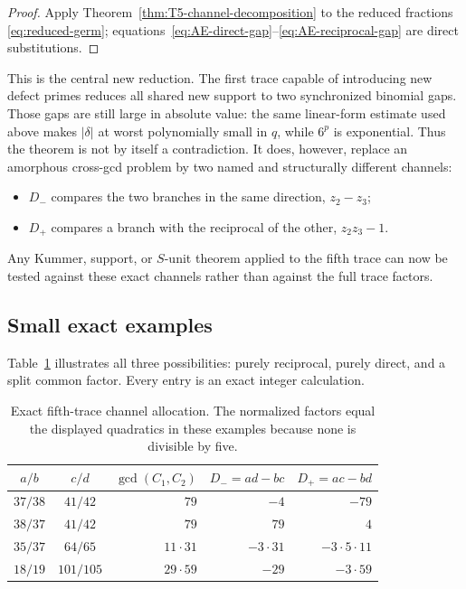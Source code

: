 \documentclass[11pt,oneside]{article}
\theoremstyle{definition}
\theoremstyle{remark}
\begin{document}
\begin{proof}
Apply Theorem~\ref{thm:T5-channel-decomposition} to the reduced fractions
\eqref{eq:reduced-germ}; equations~\eqref{eq:AE-direct-gap}--\eqref{eq:AE-reciprocal-gap}
are direct substitutions.
\end{proof}

This is the central new reduction.  The first trace capable of introducing new defect primes
reduces all shared new support to two synchronized binomial gaps.  Those gaps are still large in absolute value: the same linear-form estimate used above
makes \(|\delta|\) at worst polynomially small in \(q\), while \(6^p\) is exponential.
Thus the theorem is not by itself a contradiction.  It does, however,
replace an amorphous cross-gcd problem by two named and structurally different channels:
\begin{itemize}
\item \(D_-\) compares the two branches in the same direction, \(z_2-z_3\);
\item \(D_+\) compares a branch with the reciprocal of the other, \(z_2z_3-1\).
\end{itemize}
Any Kummer, support, or \(S\)-unit theorem applied to the fifth trace can now be tested against
these exact channels rather than against the full trace factors.

\subsection{Small exact examples}

Table~\ref{tab:T5-channels} illustrates all three possibilities: purely reciprocal, purely
direct, and a split common factor.  Every entry is an exact integer calculation.

\begin{table}[htbp]
\centering
\small
\begin{tabular}{@{}c c r r r@{}}
\toprule
\(a/b\) & \(c/d\) & \(\gcd(C_1,C_2)\) & \(D_-=ad-bc\) & \(D_+=ac-bd\)\\
\midrule
\(37/38\)&\(41/42\)&\(79\)&\(-4\)&\(-79\)\\
\(38/37\)&\(41/42\)&\(79\)&\(79\)&\(4\)\\
\(35/37\)&\(64/65\)&\(11\cdot31\)&\(-3\cdot31\)&\(-3\cdot5\cdot11\)\\
\(18/19\)&\(101/105\)&\(29\cdot59\)&\(-29\)&\(-3\cdot59\)\\
\bottomrule
\end{tabular}
\caption{Exact fifth-trace channel allocation.  The normalized factors equal the displayed
quadratics in these examples because none is divisible by five.}
\label{tab:T5-channels}
\end{table}
\end{document}
